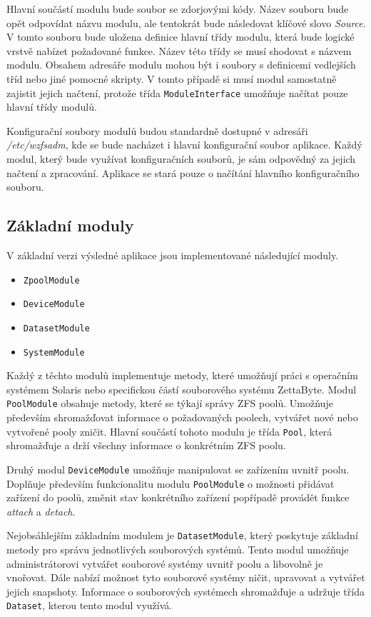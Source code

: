     Hlavní součástí modulu bude soubor se zdorjovými kódy. Název souboru bude opět odpovídat názvu modulu, ale tentokrát bude následovat klíčové slovo \emph{Source}.
    V tomto souboru bude uložena definice hlavní třídy modulu, která bude logické vrstvě nabízet požadované funkce. Název této třídy se musí shodovat s názvem modulu. Obsahem adresáře modulu mohou být i soubory s definicemi vedlejších tříd nebo jiné pomocné skripty. V tomto případě si musí modul samostatně zajistit jejich načtení, protože třída \verb|ModuleInterface| umožňuje načítat pouze hlavní třídy modulů.

    Konfigurační soubory modulů budou standardně dostupné v adresáři \emph{/etc/wzfsadm}, kde se bude nacházet i hlavní konfigurační soubor aplikace. Každý modul, který bude využívat konfiguračních souborů, je sám odpovědný za jejich načtení a zpracování. Aplikace se stará pouze o načítání hlavního konfiguračního souboru.

    \subsection{Základní moduly}
    V základní verzi výsledné aplikace jsou implementované následující moduly.
    \begin{itemize}
      \item \verb|ZpoolModule|
      \item \verb|DeviceModule|
      \item \verb|DatasetModule|
      \item \verb|SystemModule|
    \end{itemize}

    Každý z těchto modulů implementuje metody, které umožňují práci s operačním systémem Solaris nebo specifickou částí souborového systému ZettaByte. Modul \verb|PoolModule| obsahuje metody, které se týkají správy ZFS poolů. Umožňuje především shromažďovat informace o požadovaných poolech, vytvářet nové nebo vytvořené pooly zničit. Hlavní součástí tohoto modulu je třída \verb|Pool|, která shromažďuje a drží všechny informace o konkrétním ZFS poolu.

    Druhý modul \verb|DeviceModule| umožňuje manipulovat se zařízením uvnitř poolu. Doplňuje především funkcionalitu modulu \verb|PoolModule| o možnosti přidávat zařízení do poolů, změnit stav konkrétního zařízení popřípadě provádět funkce \emph{attach} a \emph{detach}.

    Nejobsáhlejším základním modulem je \verb|DatasetModule|, který poskytuje základní metody pro správu jednotlivých souborových systémů. Tento modul umožňuje administrátorovi vytvářet souborové systémy uvnitř poolu a libovolně je vnořovat. Dále nabízí možnost tyto souborové systémy ničit, upravovat a vytvářet jejich snapshoty. Informace o souborových systémech shromažďuje a udržuje třída \verb|Dataset|, kterou tento modul využívá.

